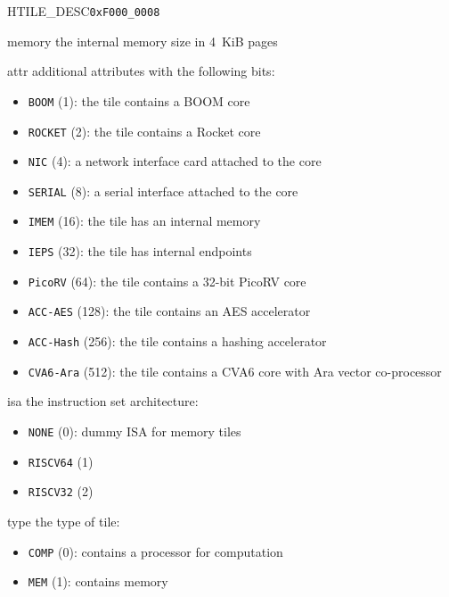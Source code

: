 \begin{register}{H}{TILE\_DESC}{\texttt{0xF000\_0008}}
  \regnewline%
  \begin{regdesc}\begin{reglist}
    \item[memory] the internal memory size in 4~KiB pages
    \item[attr] additional attributes with the following bits:
    \begin{itemize}
      \item \texttt{BOOM} (1): the tile contains a BOOM core
      \item \texttt{ROCKET} (2): the tile contains a Rocket core
      \item \texttt{NIC} (4): a network interface card attached to the core
      \item \texttt{SERIAL} (8): a serial interface attached to the core
      \item \texttt{IMEM} (16): the tile has an internal memory
      \item \texttt{IEPS} (32): the tile has internal endpoints
      \item \texttt{PicoRV} (64): the tile contains a 32-bit PicoRV core
      \item \texttt{ACC-AES} (128): the tile contains an AES accelerator
      \item \texttt{ACC-Hash} (256): the tile contains a hashing accelerator
      \item \texttt{CVA6-Ara} (512): the tile contains a CVA6 core with Ara vector co-processor
    \end{itemize}
    \item[isa] the instruction set architecture:
    \begin{itemize}
      \item \texttt{NONE} (0): dummy ISA for memory tiles
      \item \texttt{RISCV64} (1)
      \item \texttt{RISCV32} (2)
    \end{itemize}
    \item[type] the type of tile:
    \begin{itemize}
      \item \texttt{COMP} (0): contains a processor for computation
      \item \texttt{MEM} (1): contains memory
    \end{itemize}
  \end{reglist}\end{regdesc}
\end{register}

